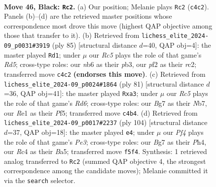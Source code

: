 \documentclass[11pt]{article}
\begin{document}
\clearpage

\begin{figure}[p]\centering
\begin{subfigure}{0.46\textwidth}\centering
\resizebox{\linewidth}{!}{%
\newchessgame
\chessboard[
  setfen={8/1p4bk/1N4p1/5p1p/P1r5/R4KPP/5P2/4r3 b - - 8 46},
  showmover=false,
  pgfstyle=straightmove, color=movearrow, markmove={c4-c2}
]}
\caption{}
\end{subfigure}\hfill
\begin{subfigure}{0.46\textwidth}\centering
\resizebox{\linewidth}{!}{%
\newchessgame
\chessboard[
  setfen={8/6p1/4kp2/p6p/P2r3P/1PK3P1/2R2P2/8 b - - 3 43},
  showmover=false,
  pgfstyle=straightmove, color=movearrow, markmove={d4-d1}
]}
\caption{}
\end{subfigure}
\\[4pt]
\begin{subfigure}{0.46\textwidth}\centering
\resizebox{\linewidth}{!}{%
\newchessgame
\chessboard[
  setfen={8/1n4pk/p6p/1p3p2/1P3N2/P2r3P/5PP1/4RK2 b - - 3 41},
  showmover=false,
  pgfstyle=straightmove, color=movearrow, markmove={d3-a3}
]}
\caption{}
\end{subfigure}\hfill
\begin{subfigure}{0.46\textwidth}\centering
\resizebox{\linewidth}{!}{%
\newchessgame
\chessboard[
  setfen={8/p2n4/r3k3/BR2pp1p/P6P/4PP2/6K1/8 w - - 0 53},
  showmover=false,
  pgfstyle=straightmove, color=movearrow, markmove={e3-e4}
]}
\caption{}
\end{subfigure}
\caption{\textbf{Move 46, Black: \texttt{Rc2}.} (a) Our position; Melanie plays \texttt{Rc2} (\texttt{c4c2}). Panels (b)--(d) are the retrieved master positions whose correspondence most drove this move (highest QAP objective among those that transfer to it). (b) Retrieved from \texttt{lichess\_elite\_2024-09\_p0031\#3919} (ply 85) [structural distance $d$=40, QAP obj=4]: the master played \texttt{Rd1}; under $\mu$ our \emph{Rc5} plays the role of that game's \emph{Rd5}; cross-type roles: our \emph{n}b6 as their \emph{p}b3, our \emph{p}f2 as their \emph{r}c2; transferred move \texttt{c4c2} \textbf{(endorses this move)}. (c) Retrieved from \texttt{lichess\_elite\_2024-09\_p0024\#1864} (ply 81) [structural distance $d$=36, QAP obj=41]: the master played \texttt{Rxa3}; under $\mu$ our \emph{Rc5} plays the role of that game's \emph{Rd6}; cross-type roles: our \emph{B}g7 as their \emph{N}b7, our \emph{R}e1 as their \emph{P}f5; transferred move \texttt{c4b4}. (d) Retrieved from \texttt{lichess\_elite\_2024-09\_p0017\#2237} (ply 104) [structural distance $d$=37, QAP obj=18]: the master played \texttt{e4}; under $\mu$ our \emph{Pf4} plays the role of that game's \emph{Pe3}; cross-type roles: our \emph{B}g7 as their \emph{P}h4, our \emph{R}c4 as their \emph{B}a5; transferred move \texttt{f5f4}. Synthesis: 1 retrieved analog transferred to \texttt{Rc2} (summed QAP objective 4, the strongest correspondence among the candidate moves); Melanie committed it via the \texttt{search} selector.}
\label{fig:thought-m91}
\end{figure}
\end{document}
